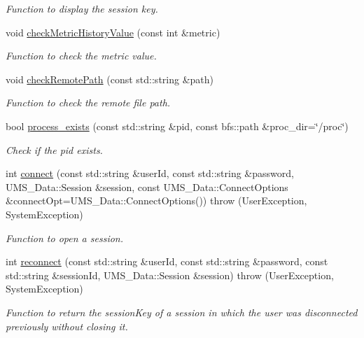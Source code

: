 \begin{DoxyCompactItemize}
\begin{DoxyCompactList}\small\item\em Function to display the session key. \item\end{DoxyCompactList}\item 
void \hyperlink{namespacevishnu_a7671a1a0faa2417f4224a68879979bc4}{checkMetricHistoryValue} (const int \&metric)
\begin{DoxyCompactList}\small\item\em Function to check the metric value. \item\end{DoxyCompactList}\item 
void \hyperlink{namespacevishnu_a3b238cf04a86c821f8a267afad489bee}{checkRemotePath} (const std::string \&path)
\begin{DoxyCompactList}\small\item\em Function to check the remote file path. \item\end{DoxyCompactList}\item 
bool \hyperlink{namespacevishnu_a04f9a9dfc61b7390150222b10f64bb70}{process\_\-exists} (const std::string \&pid, const bfs::path \&proc\_\-dir=\char`\"{}/proc\char`\"{})
\begin{DoxyCompactList}\small\item\em Check if the pid exists. \item\end{DoxyCompactList}\item 
int \hyperlink{namespacevishnu_ac58b058a6a467a21f7eb21192617c90f}{connect} (const std::string \&userId, const std::string \&password, UMS\_\-Data::Session \&session, const UMS\_\-Data::ConnectOptions \&connectOpt=UMS\_\-Data::ConnectOptions())  throw (UserException, SystemException)
\begin{DoxyCompactList}\small\item\em Function to open a session. \item\end{DoxyCompactList}\item 
int \hyperlink{namespacevishnu_ae120231ba899d68724dc972374206745}{reconnect} (const std::string \&userId, const std::string \&password, const std::string \&sessionId, UMS\_\-Data::Session \&session)  throw (UserException, SystemException)
\begin{DoxyCompactList}\small\item\em Function to return the sessionKey of a session in which the user was disconnected previously without closing it. \item\end{DoxyCompactList}\item 

\end{DoxyCompactItemize}

